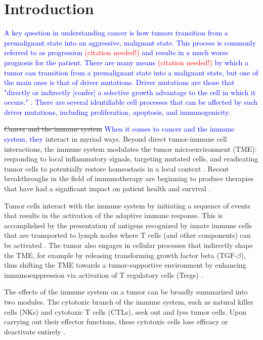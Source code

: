 \documentclass[11pt]{article}
\newcommand{\tcr} { \textcolor{red} }
\newcommand{\tcb} { \textcolor{blue} }
\begin{document}
\section{Introduction}
\tcb{
A key question in understanding cancer is how tumors transition from a premalignant state into an aggressive, malignant state.
This process is commonly referred to as progression \tcr{(citation needed!)} and results in a much worse prognosis for the patient.
There are many means \tcr{(citation needed!)} by which a tumor can transition from a premalignant state into a malignant state, but one of the main ones is that of driver mutations.
Driver mutations are those that "directly or indirectly [confer] a selective growth advantage to the cell in which it occurs." \cite{ryan2016hallmarks}.
There are several identifiable cell processes that can be affected by such driver mutations, including proliferation, apoptosis, and immunogenicity.
}
\par
\sout{Cancer and the immune system} \tcb{When it comes to cancer and the immune system, they} interact in myriad ways.
Beyond direct tumor-immune cell interactions, the immune system modulates the tumor microenvironment (TME): responding to local inflammatory signals, targeting mutated cells, and eradicating tumor cells to potentially restore homeostasis in a local context \cite{de2006paradoxical}.
Recent breakthroughs in the field of immunotherapy are beginning to produce therapies that have had a significant impact on patient health and survival \cite{pardoll2012blockade,restifo2012adoptive}.
\par 
Tumor cells interact with the immune system by initiating a sequence of events that results in the activation of the adaptive immune response. This is accomplished by the presentation of antigens recognized by innate immune cells that are transported to lymph nodes where T cells (and other components) can be activated \cite{schreiber11_cancer}. The tumor also engages in cellular processes that indirectly shape the TME, for example by releasing transforming growth factor beta (TGF-$\beta$), thus shifting the TME towards a tumor-supportive environment by enhancing immunosuppression via activation of T regulatory cells (Tregs) \cite{schreiber11_cancer}.
\par
The effects of the immune system on a tumor can be broadly summarized into two modules. The cytotoxic branch of the immune system, such as natural killer cells (NKs) and cytotoxic T cells (CTLs), seek out and lyse tumor cells.
Upon carrying out their effector functions, these cytotoxic cells lose efficacy or deactivate entirely \cite{finn12_immunooncology-1}.
\end{document}
